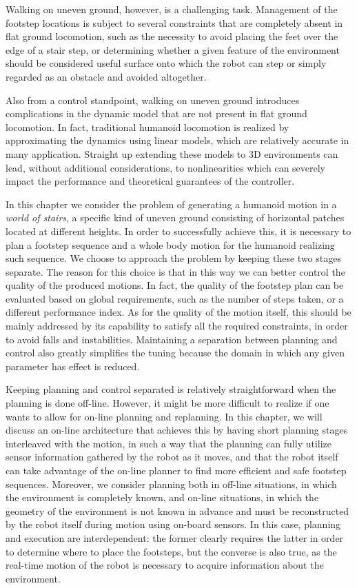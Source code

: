 Walking on uneven ground, however, is a challenging task. Management of the footstep locations is subject to several constraints that are completely absent in flat ground locomotion, such as the necessity to avoid placing the feet over the edge of a stair step, or determining whether a given feature of the environment should be considered useful surface onto which the robot can step or simply regarded as an obstacle and avoided altogether.

Also from a control standpoint, walking on uneven ground introduces complications in the dynamic model that are not present in flat ground locomotion. In fact, traditional humanoid locomotion is realized by approximating the dynamics using linear models, which are relatively accurate in many application. Straight up extending these models to 3D environments can lead, without additional considerations, to nonlinearities which can severely impact the performance and theoretical guarantees of the controller.

In this chapter we consider the problem of generating a humanoid motion in a \textit{world of stairs}, a specific kind of uneven ground consisting of horizontal patches located at different heights. In order to successfully achieve this, it is necessary to plan a footstep sequence and a whole body motion for the humanoid realizing such sequence. We choose to approach the problem by keeping these two stages separate. The reason for this choice is that in this way we can better control the quality of the produced motions. In fact, the quality of the footstep plan can be evaluated based on global requirements, such as the number of steps taken, or a different performance index. As for the quality of the motion itself, this should be mainly addressed by its capability to satisfy all the required constraints, in order to avoid falls and instabilities. Maintaining a separation between planning and control also greatly simplifies the tuning because the domain in which any given parameter has effect is reduced.

Keeping planning and control separated is relatively straightforward when the planning is done off-line. However, it might be more difficult to realize if one wants to allow for on-line planning and replanning. In this chapter, we will discuss an on-line architecture that achieves this by having short planning stages interleaved with the motion, in such a way that the planning can fully utilize sensor information gathered by the robot as it moves, and that the robot itself can take advantage of the on-line planner to find more efficient and safe footstep sequences.
Moreover, we consider planning both in off-line situations, in which the environment is completely known, and on-line situations, in which the geometry of the environment is not known in advance and must be reconstructed by the robot itself during motion using on-board sensors. In this case, planning and execution are interdependent: the former clearly requires the latter in order to determine where to place the footsteps, but the converse is also true, as the real-time motion of the robot is necessary to acquire information about the environment.

